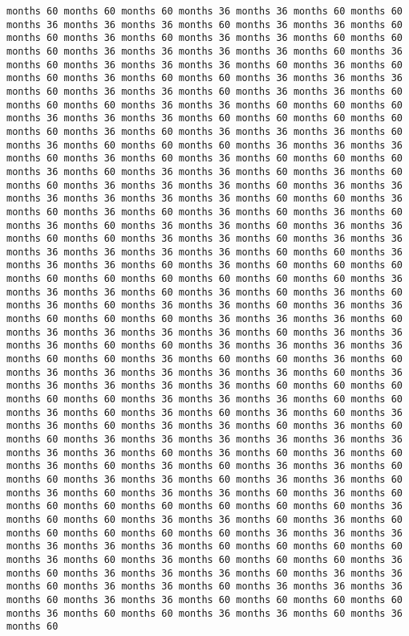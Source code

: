 \documentclass[11pt]{article}
\begin{document}
\begin{Verbatim}[commandchars=\\\{\}, frame=single, framerule=2mm, rulecolor=\color{outerrorbackground}]
months 60 months 60 months 60 months 36 months 36 months 60 months 60 months 36 months 36 months 36 months 60 months 36 months 36 months 60 months 60 months 36 months 60 months 36 months 36 months 60 months 60 months 60 months 36 months 36 months 36 months 36 months 60 months 36 months 60 months 36 months 36 months 36 months 60 months 36 months 60 months 60 months 36 months 60 months 60 months 36 months 36 months 36 months 60 months 36 months 36 months 60 months 36 months 36 months 60 months 60 months 60 months 36 months 36 months 60 months 60 months 60 months 36 months 36 months 36 months 60 months 60 months 60 months 60 months 60 months 36 months 60 months 36 months 36 months 36 months 60 months 36 months 60 months 60 months 60 months 36 months 36 months 36 months 60 months 36 months 60 months 36 months 60 months 60 months 60 months 36 months 60 months 36 months 36 months 60 months 36 months 60 months 60 months 36 months 36 months 36 months 60 months 36 months 36 months 36 months 36 months 36 months 36 months 60 months 60 months 36 months 60 months 36 months 60 months 36 months 60 months 36 months 60 months 36 months 60 months 36 months 36 months 60 months 36 months 36 months 60 months 60 months 36 months 36 months 60 months 36 months 36 months 36 months 36 months 36 months 36 months 60 months 60 months 36 months 36 months 36 months 60 months 36 months 60 months 60 months 60 months 60 months 60 months 60 months 60 months 60 months 60 months 36 months 36 months 36 months 60 months 36 months 60 months 36 months 60 months 36 months 60 months 36 months 36 months 60 months 36 months 36 months 60 months 60 months 60 months 36 months 36 months 36 months 60 months 36 months 36 months 36 months 36 months 60 months 36 months 36 months 36 months 60 months 60 months 36 months 36 months 36 months 36 months 60 months 60 months 36 months 60 months 60 months 36 months 60 months 36 months 36 months 36 months 36 months 36 months 60 months 36 months 36 months 36 months 36 months 36 months 60 months 60 months 60 months 60 months 60 months 36 months 36 months 36 months 60 months 60 months 36 months 60 months 36 months 60 months 36 months 60 months 36 months 36 months 60 months 36 months 36 months 60 months 36 months 60 months 60 months 36 months 36 months 36 months 36 months 36 months 36 months 36 months 36 months 60 months 36 months 60 months 36 months 60 months 36 months 60 months 36 months 60 months 36 months 36 months 60 months 60 months 36 months 36 months 60 months 36 months 36 months 60 months 36 months 60 months 36 months 36 months 60 months 36 months 60 months 60 months 60 months 60 months 60 months 60 months 60 months 36 months 60 months 60 months 36 months 36 months 60 months 36 months 60 months 60 months 60 months 60 months 60 months 36 months 36 months 36 months 36 months 36 months 36 months 60 months 60 months 60 months 60 months 36 months 60 months 36 months 60 months 60 months 60 months 36 months 60 months 36 months 36 months 36 months 60 months 36 months 36 months 60 months 36 months 36 months 60 months 36 months 36 months 36 months 60 months 36 months 36 months 60 months 60 months 60 months 60 months 36 months 60 months 60 months 36 months 36 months 60 months 36 months 60 
\end{Verbatim}
\end{document}
